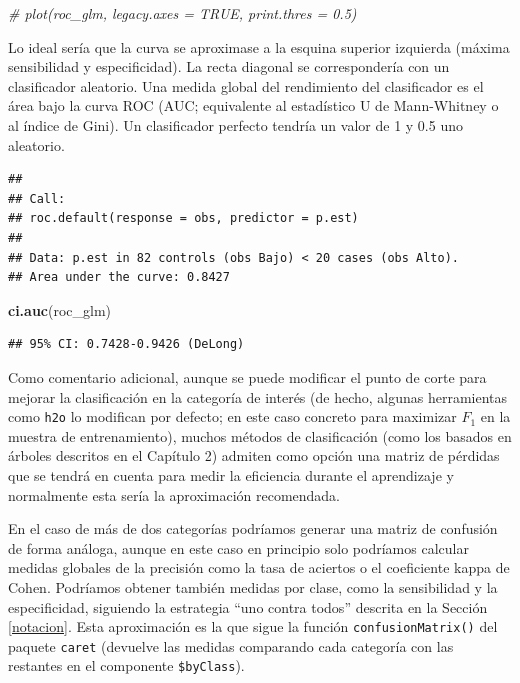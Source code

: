 \documentclass[
]{book}
\newenvironment{Shaded}{\begin{snugshade}}{\end{snugshade}}
\newcommand{\CommentTok}[1]{\textcolor[rgb]{0.56,0.35,0.01}{\textit{#1}}}
\newcommand{\KeywordTok}[1]{\textcolor[rgb]{0.13,0.29,0.53}{\textbf{#1}}}
\newcommand{\NormalTok}[1]{#1}
\theoremstyle{break}
\theoremstyle{definition}
\theoremstyle{definition}
\theoremstyle{definition}
\theoremstyle{remark}
\begin{document}
\begin{Shaded}
\begin{Highlighting}[]
\CommentTok{# plot(roc_glm, legacy.axes = TRUE, print.thres = 0.5)}
\end{Highlighting}
\end{Shaded}

Lo ideal sería que la curva se aproximase a la esquina superior izquierda (máxima sensibilidad y especificidad).
La recta diagonal se correspondería con un clasificador aleatorio.
Una medida global del rendimiento del clasificador es el área bajo la curva ROC (AUC; equivalente al estadístico U de Mann-Whitney o al índice de Gini).
Un clasificador perfecto tendría un valor de 1 y 0.5 uno aleatorio.

\begin{Shaded}
\end{Shaded}

\begin{verbatim}
## 
## Call:
## roc.default(response = obs, predictor = p.est)
## 
## Data: p.est in 82 controls (obs Bajo) < 20 cases (obs Alto).
## Area under the curve: 0.8427
\end{verbatim}

\begin{Shaded}
\begin{Highlighting}[]
\KeywordTok{ci.auc}\NormalTok{(roc_glm)}
\end{Highlighting}
\end{Shaded}

\begin{verbatim}
## 95% CI: 0.7428-0.9426 (DeLong)
\end{verbatim}

Como comentario adicional, aunque se puede modificar el punto de corte para mejorar la clasificación en la categoría de interés (de hecho, algunas herramientas como \texttt{h2o} lo modifican por defecto; en este caso concreto para maximizar \(F_1\) en la muestra de entrenamiento), muchos métodos de clasificación (como los basados en árboles descritos en el Capítulo 2) admiten como opción una matriz de pérdidas que se tendrá en cuenta para medir la eficiencia durante el aprendizaje y normalmente esta sería la aproximación recomendada.

En el caso de más de dos categorías podríamos generar una matriz de confusión de forma análoga,
aunque en este caso en principio solo podríamos calcular medidas globales de la precisión como la tasa de aciertos o el coeficiente kappa de Cohen.
Podríamos obtener también medidas por clase, como la sensibilidad y la especificidad, siguiendo la estrategia ``uno contra todos'' descrita en la Sección \ref{notacion}.
Esta aproximación es la que sigue la función \texttt{confusionMatrix()} del paquete \texttt{caret} (devuelve las medidas comparando cada categoría con las restantes en el componente \texttt{\$byClass}).
\end{document}
